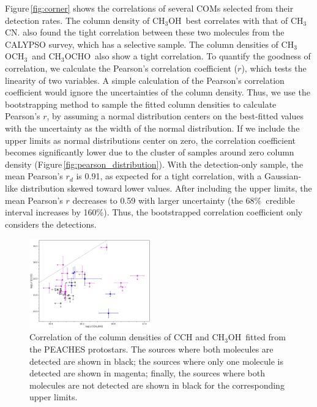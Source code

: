 \documentclass[twocolumn]{aastex62}
\newcommand{\methylformate}{\mbox{CH$_{3}$OCHO}}
\newcommand{\methanol}{\mbox{CH$_{3}$OH}}
\newcommand{\dimethylether}{\mbox{CH$_{3}$OCH$_{3}$}}
\newcommand{\methylcyanide}{\mbox{CH$_{3}$CN}}
\begin{document}
Figure\,\ref{fig:corner} shows the correlations of several COMs selected from their detection rates.  The column density of \methanol\ best correlates with that of \methylcyanide.  \citet{2020A&A...635A.198B} also found the tight correlation between these two molecules from the CALYPSO survey, which has a selective sample.  The column densities of \dimethylether\ and \methylformate\ also show a tight correlation.  To quantify the goodness of correlation, we calculate the Pearson's correlation coefficient ($r$), which tests the linearity of two variables.  A simple calculation of the Pearson's correlation coefficient would ignore the uncertainties of the column density.  Thus, we use the bootstrapping method to sample the fitted column densities to calculate Pearson's $r$, by assuming a normal distribution centers on the best-fitted values with the uncertainty as the width of the normal distribution.  If we include the upper limits as normal distributions center on zero, the correlation coefficient becomes significantly lower due to the cluster of samples around zero column density (Figure\,\ref{fig:pearson_distribution}).  With the detection-only sample, the mean Pearson's $r_{d}$ is 0.91, as expected for a tight correlation, with a Gaussian-like distribution skewed toward lower values.  After including the upper limits, the mean Pearson's $r$ decreases to 0.59 with larger uncertainty (the 68\%\ credible interval increases by 160\%).  Thus, the bootstrapped correlation coefficient only considers the detections.

\begin{figure}[htbp!]
  \centering
  \includegraphics[width=0.47\textwidth]{Ncol_ch3oh_cch.pdf}
  \caption{Correlation of the column densities of CCH and \methanol\ fitted from the PEACHES protostars.  The sources where both molecules are detected are shown in black; the sources where only one molecule is detected are shown in magenta; finally, the sources where both molecules are not detected are shown in black for the corresponding upper limits.}
  \label{fig:cch_ch3oh}
\end{figure}
\end{document}
